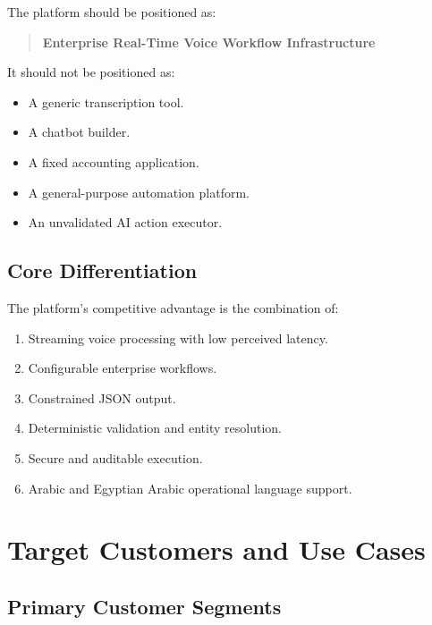 \documentclass[11pt,a4paper]{article}
\begin{document}
The platform should be positioned as:

\begin{quote}
\textbf{Enterprise Real-Time Voice Workflow Infrastructure}
\end{quote}

It should not be positioned as:

\begin{itemize}
\item A generic transcription tool.
\item A chatbot builder.
\item A fixed accounting application.
\item A general-purpose automation platform.
\item An unvalidated AI action executor.
\end{itemize}

\subsection{Core Differentiation}

The platform's competitive advantage is the combination of:

\begin{enumerate}
\item Streaming voice processing with low perceived latency.
\item Configurable enterprise workflows.
\item Constrained JSON output.
\item Deterministic validation and entity resolution.
\item Secure and auditable execution.
\item Arabic and Egyptian Arabic operational language support.
\end{enumerate}

\section{Target Customers and Use Cases}

\subsection{Primary Customer Segments}
\end{document}
